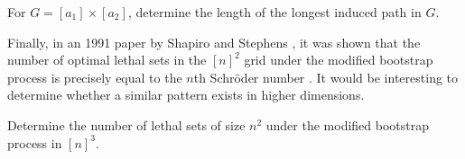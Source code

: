 \begin{prob}
For $G=[a_1] \times [a_2]$, determine the length of the longest induced path in $G$.
\end{prob}

Finally, in an 1991 paper by Shapiro and Stephens \cite{shapiro1991bootstrap}, it was shown that the number of optimal lethal sets in the $[n]^2$ grid under the modified bootstrap process is precisely equal to the $n$th Schr\"oder number \cite{oeis}. It would be interesting to determine whether a similar pattern exists in higher dimensions.

\begin{prob}
Determine the number of lethal sets of size $n^2$ under the modified bootstrap process in $[n]^3$.
\end{prob}



